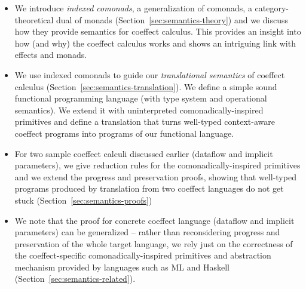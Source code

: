 \begin{itemize}
\item We introduce \emph{indexed comonads}, a generalization of comonads, a category-theoretical
  dual of monads (Section~\ref{sec:semantics-theory}) and we discuss how they provide semantics
  for coeffect calculus. This provides an insight into how (and why) the coeffect calculus works and
  shows an intriguing link with effects and monads.

\item We use indexed comonads to guide our \emph{translational semantics} of coeffect calculus
  (Section~\ref{sec:semantics-translation}). We define a simple sound functional programming
  language (with type system and operational semantics). We extend it with uninterpreted
  comonadically-inspired primitives and define a translation that turns well-typed context-aware
  coeffect programs into programs of our functional language.

\item For two sample coeffect calculi discussed earlier (dataflow and implicit parameters),
  we give reduction rules for the comonadically-inspired primitives and we extend the progress
  and preservation proofs, showing that well-typed programs produced by translation from two
  coeffect languages do not get stuck (Section~\ref{sec:semantics-proofs})

\item We note that the proof for concrete coeffect language (dataflow and implicit parameters) can
  be generalized -- rather than reconsidering progress and preservation of the whole target
  language, we rely just on the correctness of the coeffect-specific comonadically-inspired
  primitives and abstraction mechanism provided by languages such as ML and Haskell
  (Section~\ref{sec:semantics-related}).
\end{itemize}


%
%

